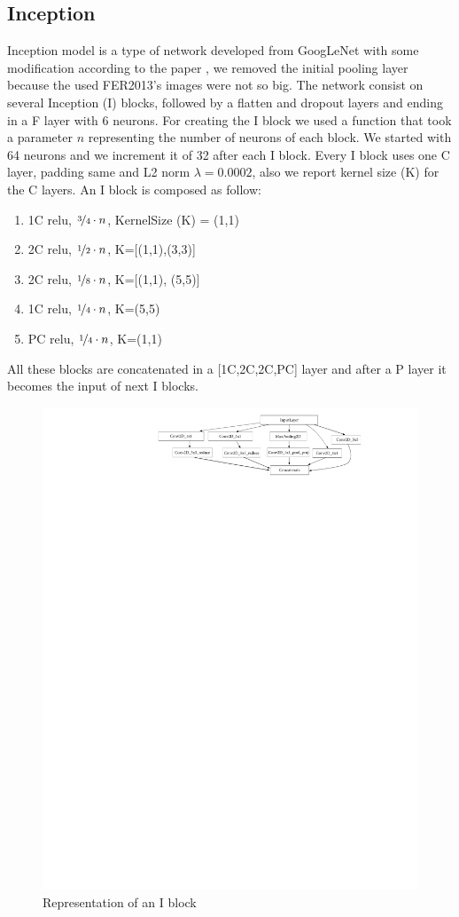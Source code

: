 \documentclass[10pt,twocolumn,letterpaper]{article}
\begin{document}
\subsection{Inception}
\label{subsection:Inception}
Inception model is a type of network developed from GoogLeNet \cite{13} with some modification according to the paper \cite{147}, we removed the initial pooling layer because the used FER2013's images were not so big. The network consist on several Inception (I) blocks, followed by a flatten and dropout layers and ending in a F layer with 6 neurons. For creating the I block we used a function that took a parameter $n$ representing the number of neurons of each block. We started with 64 neurons and we increment it of 32 after each I block. Every I block uses one C layer, padding same and L2 norm $\lambda=0.0002$, also we report kernel size (K) for the C layers. An I block is composed as follow:
\begin{enumerate}[noitemsep]%
   \item 1C relu, $\nicefrac{3}{4}\cdot n$, KernelSize (K) = (1,1)
   \item 2C relu, $\nicefrac{1}{2}\cdot n$, K=[(1,1),(3,3)]
   \item 2C relu, $\nicefrac{1}{8}\cdot n$, K=[(1,1), (5,5)]
   \item 1C relu, $\nicefrac{1}{4}\cdot n$, K=(5,5)
   \item PC relu, $\nicefrac{1}{4}\cdot n$, K=(1,1)
\end{enumerate}
All these blocks are concatenated in a [1C,2C,2C,PC] layer and after a P layer it becomes the input of next I blocks.
\begin{figure}[h]
   \centering
   \includegraphics[width=0.9\linewidth]{./immagini/m_inception_v0.pdf}
   \caption{Representation of an I block}
\end{figure}
\vspace{-0.2cm}
\end{document}
